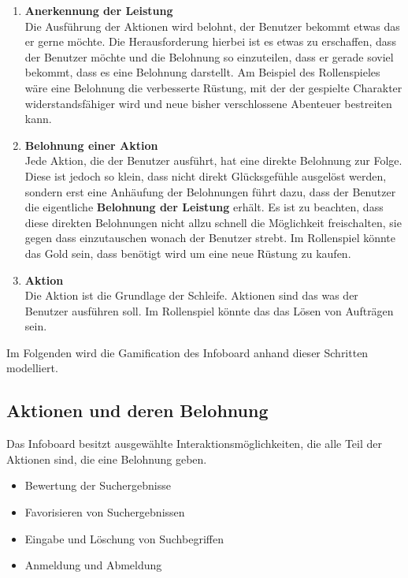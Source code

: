 \documentclass[12pt,twoside]{book}
\begin{document}
\begin{enumerate}
  \item \textbf{Anerkennung der Leistung} \\
  Die Ausführung der Aktionen wird belohnt, der Benutzer bekommt etwas das er gerne möchte. Die Herausforderung hierbei ist es etwas zu erschaffen, dass der Benutzer möchte und die Belohnung so einzuteilen, dass er gerade soviel bekommt, dass es eine Belohnung darstellt. Am Beispiel des Rollenspieles wäre eine Belohnung die verbesserte Rüstung, mit der der gespielte Charakter widerstandsfähiger wird und neue bisher verschlossene Abenteuer bestreiten kann.
  \item \textbf{Belohnung einer Aktion}\\
  Jede Aktion, die der Benutzer ausführt, hat eine direkte Belohnung zur Folge. Diese ist jedoch so klein, dass nicht direkt Glücksgefühle ausgelöst werden, sondern erst eine Anhäufung der Belohnungen führt dazu, dass der Benutzer die eigentliche \textbf{Belohnung der Leistung} erhält. Es ist zu beachten, dass diese direkten Belohnungen nicht allzu schnell die Möglichkeit freischalten, sie gegen dass einzutauschen wonach der Benutzer strebt. Im Rollenspiel könnte das Gold sein, dass benötigt wird um eine neue Rüstung zu kaufen.
  \item \textbf{Aktion}\\
  Die Aktion ist die Grundlage der Schleife. Aktionen sind das was der Benutzer ausführen soll. Im Rollenspiel könnte das das Lösen von Aufträgen sein.
\end{enumerate}

Im Folgenden wird die Gamification des Infoboard anhand dieser Schritten modelliert.

\subsection{Aktionen und deren Belohnung}

Das Infoboard besitzt ausgewählte Interaktionsmöglichkeiten, die alle Teil der Aktionen sind, die eine Belohnung geben.

\begin{itemize}
  \item Bewertung der Suchergebnisse
  \item Favorisieren von Suchergebnissen
  \item Eingabe und Löschung von Suchbegriffen
  \item Anmeldung und Abmeldung
\end{itemize}
\end{document}
